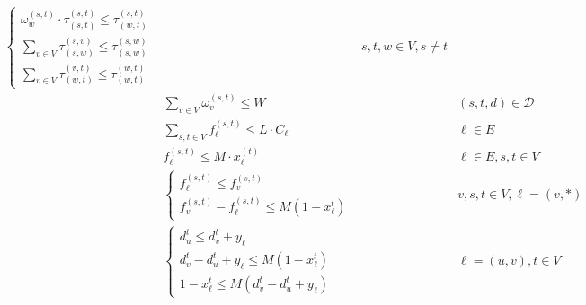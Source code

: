 \documentclass[a4paper,USenglish]{lipics-v2018}
\begin{document}
\begin{align}
\begin{cases*}
 \omega^{(s,t)}_{w}  \cdot \tau^{(s,t)}_{(s,t)} \leq  \tau^{(s,t)}_{(w,t)}\\
 \sum_{ v\in V} \tau^{(s,v)}_{(s,w)} \leq \tau^{(s,w)}_{(s,w)} \\
   \sum_{ v\in V} \tau^{(v,t)}_{(w,t)} \leq  \tau^{(w,t)}_{(w,t)} 
 \end{cases*}
 &&  s,t,w \in V, s\neq t
 \\
 &\sum_{v \in V}  \omega^{(s,t)}_v \leq W
 &&  (s,t,d) \in \mathcal{D}
 \label{LP:wp_limit} 
 \\
 & \sum_{ s,t \in V} f^{(s,t)}_{\ell} \leq L \cdot C_{\ell}
 &&  \ell \in E
 \\
&   f^{(s,t)}_{\ell} \leq M \cdot x^{(t)}_{\ell}
&&  \ell \in E, s,t \in V
 \label{LP:SPTree} 
 \\
&
\begin{cases*}
	f^{(s,t)}_{\ell} \leq f^{(s,t)}_{v}	\\
	f^{(s,t)}_{v} - f^{(s,t)}_{\ell} \leq M(1 - x^{t}_{\ell}) 
\end{cases*}	
&&  v,s,t \in V, \ell = (v,*)
 \label{LP:equalSplit} 
\\ 
&\begin{cases*}
	d^{t}_u \leq d^{t}_v + y_{\ell} \\
	d^{t}_v - d^{t}_u + y_{\ell} \leq M(1 - x^t_{\ell})	\\
	1 - x^t_{\ell} \leq M(d^{t}_v - d^{t}_u + y_{\ell})
\end{cases*}
&&  \ell = (u,v),  t \in V
 \label{LP:weights} 
\end{align}
\end{document}

